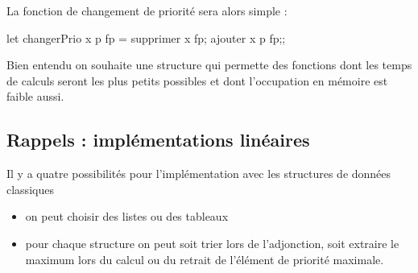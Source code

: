 La fonction de changement de priorité sera alors simple :
\begin{ocaml}
let changerPrio x p fp =
   supprimer x fp;
   ajouter x p fp;;
\end{ocaml}

\medskip

Bien entendu on souhaite une structure qui permette des fonctions dont les temps de calculs seront les plus petits possibles et dont l'occupation en mémoire est faible aussi.
\newpage
\subsection{Rappels : implémentations linéaires}
Il y a quatre possibilités pour l'implémentation avec les structures de données classiques
\begin{itemize}
\item on peut choisir des listes ou des tableaux

\item pour chaque structure on peut soit trier lors de l'adjonction, soit extraire le maximum lors du calcul ou du retrait de l'élément de priorité maximale.
\end{itemize}
